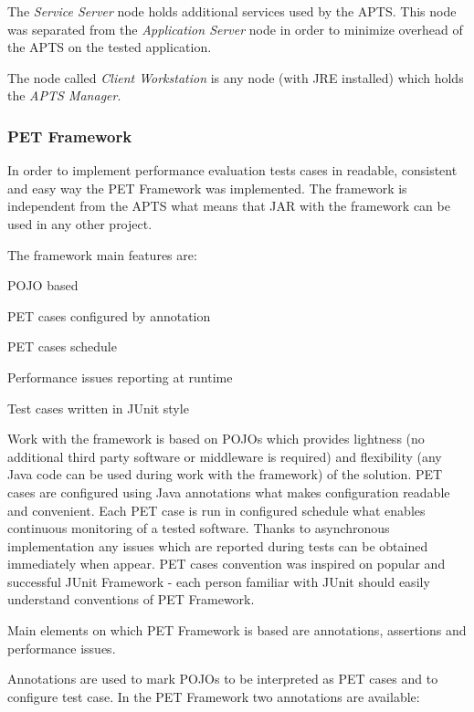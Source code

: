 \documentclass[10pt,a4paper]{article}
\let\tempone\itemize
\let\temptwo\enditemize
\renewenvironment{itemize}{\tempone\addtolength{\itemsep}{-0.4\baselineskip}}{\temptwo}
\begin{document}
The \textit{Service Server} node holds additional services used by the APTS. This node was separated from the \textit{Application Server} node in order to minimize overhead of the APTS on the tested application.

The node called \textit{Client Workstation} is any node (with JRE installed) which holds the \textit{APTS Manager}. 


\subsubsection{PET Framework} \label{framework}
 
In order to implement performance evaluation tests cases in readable, consistent and easy way the PET Framework was implemented. The framework is independent from the APTS what means that JAR with the framework can be used in any other project. 

The framework main features are:
\begin{itemize}
\item POJO based
\item PET cases configured by annotation
\item PET cases schedule
\item Performance issues reporting at runtime 
\item Test cases written in JUnit \cite{junit} style
\end{itemize}

Work with the framework is based on POJOs which provides lightness (no additional third party software or middleware is required) and flexibility (any Java code can be used during work with the framework) of the solution. PET cases are  configured using Java annotations what makes configuration readable and convenient. Each PET case is run in configured schedule what enables continuous monitoring of a tested software. Thanks to asynchronous implementation any issues which are reported during tests can be obtained immediately when appear. PET cases convention was inspired on popular and successful JUnit Framework - each person familiar with JUnit should easily understand conventions of PET Framework.       

Main elements on which PET Framework is based are annotations, assertions and performance issues. 

Annotations are used to mark POJOs to be interpreted as PET cases and to configure test case. In the PET Framework two annotations are available:
\end{document}
